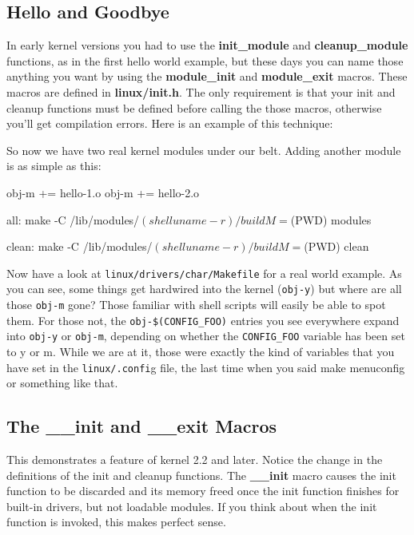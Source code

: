 \documentclass[10pt, oneside]{book}
\begin{document}
\subsection{Hello and Goodbye}
\label{hello_n_goodbye}
In early kernel versions you had to use the \textbf{init\_module} and \textbf{cleanup\_module} functions, as in the first hello world example, but these days you can name those anything you want by using the \textbf{module\_init} and \textbf{module\_exit} macros.
These macros are defined in \textbf{linux/init.h}. The only requirement is that your init and cleanup functions must be defined before calling the those macros, otherwise you'll get compilation errors.
Here is an example of this technique:


So now we have two real kernel modules under our belt. Adding another module is as simple as this:

\begin{code}
obj-m += hello-1.o
obj-m += hello-2.o

all:
	make -C /lib/modules/$(shell uname -r)/build M=$(PWD) modules

clean:
	make -C /lib/modules/$(shell uname -r)/build M=$(PWD) clean
\end{code}

Now have a look at \verb|linux/drivers/char/Makefile| for a real world example.
As you can see, some things get hardwired into the kernel (\verb|obj-y|) but where are all those \verb|obj-m| gone?
Those familiar with shell scripts will easily be able to spot them.
For those not, the \verb|obj-$(CONFIG_FOO)| entries you see everywhere expand into \verb|obj-y| or \verb|obj-m|, depending on whether the \verb|CONFIG_FOO| variable has been set to y or m.
While we are at it, those were exactly the kind of variables that you have set in the \verb|linux/.confi|g file, the last time when you said make menuconfig or something like that.

\subsection{The \_\_init and \_\_exit Macros}
\label{init_n_exit}
This demonstrates a feature of kernel 2.2 and later.
Notice the change in the definitions of the init and cleanup functions.
The \textbf{\_\_init} macro causes the init function to be discarded and its memory freed once the init function finishes for built-in drivers, but not loadable modules.
If you think about when the init function is invoked, this makes perfect sense.
\end{document}
